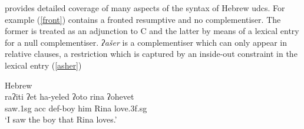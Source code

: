 \documentclass[output=paper,hidelinks]{langscibook}
\begin{document}





\ea
\label{heb-udc-rule} 
\z



\citet{Asudeh12} provides detailed coverage of many aspects of the syntax of Hebrew {\sc udc}s. For example (\ref{front}) contains a fronted resumptive and no complementiser. The former is treated as an adjunction to C and the latter by means of a lexical entry for a null complementiser. {\em {ʔ}ašer} is a complementiser which can only appear in relative clauses, a restriction which is captured by an inside-out constraint in the lexical entry (\ref{asher})





\ea \label{front}  Hebrew \citep[220]{Borer:84}\\
\gll ra{ʔ}iti {ʔ}et ha-yeled {ʔ}oto rina {ʔ}ohevet \\
saw.{\sc 1sg} {\sc acc} {\sc def}-boy him Rina love.{\sc 3f.sg}\\
\glt `I saw the boy that Rina loves.'
\z
\end{document}

